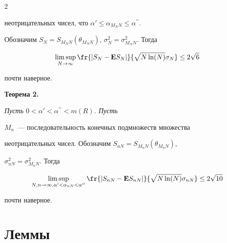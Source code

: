 \begin{multicols}{2}
{неотрицательных чисел, что $\alpha'\le\alpha_{M_NN}\le\alpha^{\prime\prime}$.


Обозначим $S_{N}=S_{M_NN}(\theta_{M_NN})$, $\sigma^2_N=


\sigma^2_{M_NN}$. Тогда


\begin{equation}


\limsup_{N\to\infty}\fr{|S_N-{\E}S_N|}{\sqrt{N\ln(N)}\sigma_N}\le


2\sqrt{6} 


\label{e1.4faz}


\end{equation}


почти наверное. }





\medskip





\noindent





\textbf{Теорема 2.} {\it Пусть  $0<\alpha'< \alpha^{\prime\prime}<m(R)$. Пусть


$M_n$~---  последовательность конечных подмножеств множества


неотрицательных чисел.  Обозначим $S_{nN}=S_{M_nN}(\theta_{M_nN})$,


$\sigma^2_{nN}= \sigma^2_{M_nN}$.  Тогда


\begin{equation}


\limsup_{N,n\to\infty,\alpha'<\alpha_{nN}< \alpha^{\prime\prime}


 }


\fr{|S_{nN}-{\E}S_{nN} |}{\sqrt{N\ln(N)}\sigma_{nN}}


 \le 2\sqrt{10}


\label{e1.5faz}


\end{equation}


почти наверное. }













\section{Леммы}






\end{multicols}
